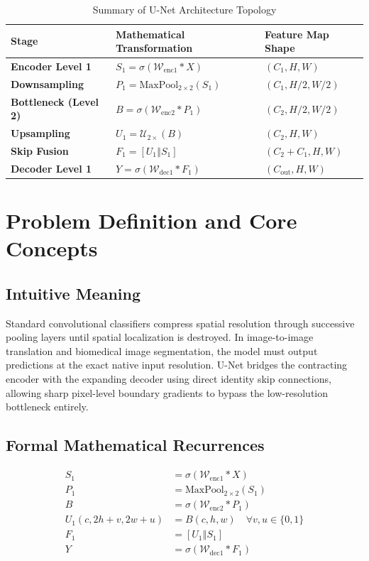 \documentclass[11pt,a4paper]{article}
\theoremstyle{definition}
\begin{document}
\begin{table}[h]
\centering
\caption{Summary of U-Net Architecture Topology}
\begin{tabular}{lll}
\toprule
\textbf{Stage} & \textbf{Mathematical Transformation} & \textbf{Feature Map Shape} \\
\midrule
\textbf{Encoder Level 1} & $S_1 = \sigma(\mathcal{W}_{\text{enc1}} * X)$ & $(C_1, H, W)$ \\
\textbf{Downsampling} & $P_1 = \text{MaxPool}_{2 \times 2}(S_1)$ & $(C_1, H/2, W/2)$ \\
\textbf{Bottleneck (Level 2)} & $B = \sigma(\mathcal{W}_{\text{enc2}} * P_1)$ & $(C_2, H/2, W/2)$ \\
\textbf{Upsampling} & $U_1 = \mathcal{U}_{2 \times}(B)$ & $(C_2, H, W)$ \\
\textbf{Skip Fusion} & $F_1 = [U_1 \mathbin{\Vert} S_1]$ & $(C_2 + C_1, H, W)$ \\
\textbf{Decoder Level 1} & $Y = \sigma(\mathcal{W}_{\text{dec1}} * F_1)$ & $(C_{\text{out}}, H, W)$ \\
\bottomrule
\end{tabular}
\end{table}

\section{Problem Definition and Core Concepts}

\subsection{Intuitive Meaning}
Standard convolutional classifiers compress spatial resolution through successive pooling layers until spatial localization is destroyed. In image-to-image translation and biomedical image segmentation, the model must output predictions at the exact native input resolution. U-Net bridges the contracting encoder with the expanding decoder using direct identity skip connections, allowing sharp pixel-level boundary gradients to bypass the low-resolution bottleneck entirely.

\subsection{Formal Mathematical Recurrences}

\begin{align}
S_1 &= \sigma(\mathcal{W}_{\text{enc1}} * X) \\
P_1 &= \text{MaxPool}_{2 \times 2}(S_1) \\
B &= \sigma(\mathcal{W}_{\text{enc2}} * P_1) \\
U_1(c, 2h + v, 2w + u) &= B(c, h, w) \quad \forall v, u \in \{0, 1\} \\
F_1 &= [U_1 \mathbin{\Vert} S_1] \\
Y &= \sigma(\mathcal{W}_{\text{dec1}} * F_1)
\end{align}
\end{document}

